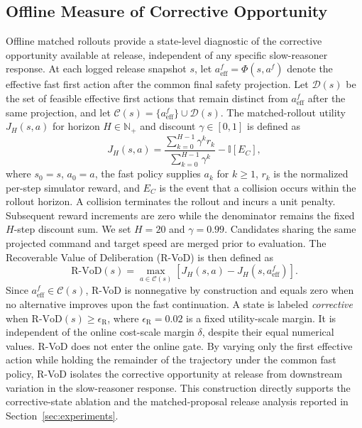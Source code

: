 \documentclass[letterpaper,journal]{IEEEtran}
\begin{document}
\subsection{Offline Measure of Corrective Opportunity}
Offline matched rollouts provide a state-level diagnostic of the corrective
opportunity available at release, independent of any specific slow-reasoner
response. At each logged release snapshot $s$, let
$a_{\mathrm{eff}}^f=\Phi(s,a^f)$ denote the effective fast first action after
the common final safety projection. Let $\mathcal D(s)$ be the set of feasible
effective first actions that remain distinct from $a_{\mathrm{eff}}^f$ after
the same projection, and let
$\mathcal C(s)=\{a_{\mathrm{eff}}^f\}\cup\mathcal D(s)$. The matched-rollout
utility $J_H(s,a)$ for horizon $H\in\mathbb N_+$ and discount $\gamma\in[0,1]$
is defined as
\begin{equation}
J_H(s,a)=\frac{\sum_{k=0}^{H-1}\gamma^k r_k}
{\sum_{k=0}^{H-1}\gamma^k}
-\mathbb{I}[E_C],
\label{eq:rollout_utility}
\end{equation}
where $s_0=s$, $a_0=a$, the fast policy supplies $a_k$ for $k\ge1$,
$r_k$ is the normalized per-step simulator reward, and $E_C$ is the event that a
collision occurs within the rollout horizon. A collision terminates the rollout
and incurs a unit penalty. Subsequent reward increments are zero while the
denominator remains the fixed $H$-step discount sum. We set $H=20$ and $\gamma=0.99$.
Candidates sharing
the same projected command and target speed are merged prior to evaluation. The
Recoverable Value of Deliberation (R-VoD) is then defined as
\begin{equation}
\mathrm{R\text{-}VoD}(s)=
\max_{a\in\mathcal C(s)}
\left[J_H(s,a)-J_H(s,a_{\mathrm{eff}}^f)\right].
\label{eq:rvod}
\end{equation}
Since $a_{\mathrm{eff}}^f\in\mathcal C(s)$, R-VoD is nonnegative by
construction and equals zero when no alternative improves upon the fast
continuation. A state is labeled \emph{corrective} when
$\mathrm{R\text{-}VoD}(s)\geq\epsilon_{\mathrm{R}}$, where
$\epsilon_{\mathrm{R}}=0.02$ is a fixed utility-scale margin. It is independent
of the online cost-scale margin $\delta$, despite their equal numerical values.
R-VoD does not enter the online gate. By varying only the first effective action while holding the remainder of the
trajectory under the common fast policy, R-VoD isolates the corrective
opportunity at release from downstream variation in the slow-reasoner response.
This construction directly supports the corrective-state ablation and the
matched-proposal release analysis reported in Section~\ref{sec:experiments}.
\end{document}
